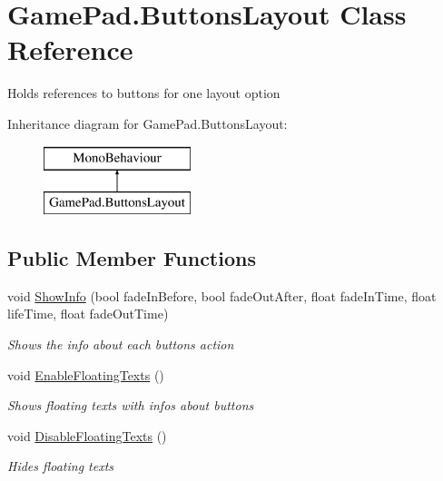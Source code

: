 \hypertarget{class_game_pad_1_1_buttons_layout}{}\section{Game\+Pad.\+Buttons\+Layout Class Reference}
\label{class_game_pad_1_1_buttons_layout}


Holds references to buttons for one layout option  


Inheritance diagram for Game\+Pad.\+Buttons\+Layout\+:\begin{figure}[H]
\begin{center}
\leavevmode
\includegraphics[height=2.000000cm]{class_game_pad_1_1_buttons_layout}
\end{center}
\end{figure}
\subsection*{Public Member Functions}
\begin{DoxyCompactItemize}
\item 
void \mbox{\hyperlink{class_game_pad_1_1_buttons_layout_a3d68ab60f31b4c6d43c66668b477e5b4}{Show\+Info}} (bool fade\+In\+Before, bool fade\+Out\+After, float fade\+In\+Time, float life\+Time, float fade\+Out\+Time)
\begin{DoxyCompactList}\small\item\em Shows the info about each button\textquotesingle{}s action \end{DoxyCompactList}\item 
void \mbox{\hyperlink{class_game_pad_1_1_buttons_layout_a607219842136259c53d4e70f1cb52c9d}{Enable\+Floating\+Texts}} ()
\begin{DoxyCompactList}\small\item\em Shows floating texts with infos about buttons \end{DoxyCompactList}\item 
void \mbox{\hyperlink{class_game_pad_1_1_buttons_layout_a5fa09be50f3e6c30e8b2646fbb2b6b9a}{Disable\+Floating\+Texts}} ()
\begin{DoxyCompactList}\small\item\em Hides floating texts \end{DoxyCompactList}\end{DoxyCompactItemize}
